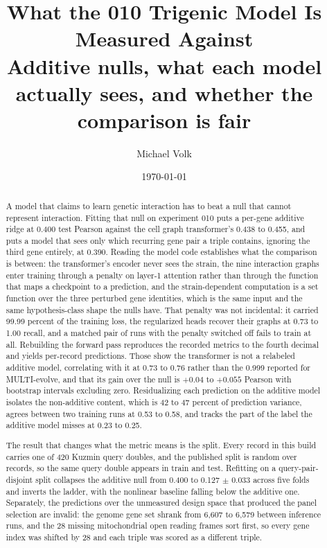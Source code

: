 \documentclass[10pt,a4paper]{article}
\title{\vspace{-1.5em}What the 010 Trigenic Model Is Measured Against\\
  {\large Additive nulls, what each model actually sees, and whether the
   comparison is fair}}
\author{Michael Volk}
\date{\today}
\begin{document}
\maketitle
\thispagestyle{empty}

\begin{abstract}
\noindent
A model that claims to learn genetic interaction has to beat a null that cannot
represent interaction. Fitting that null on experiment 010 puts a per-gene
additive ridge at 0.400 test Pearson against the cell graph transformer's 0.438
to 0.455, and puts a model that sees only which recurring gene pair a triple
contains, ignoring the third gene entirely, at 0.390. Reading the model code
establishes what the comparison is between: the transformer's encoder never sees
the strain, the nine interaction graphs enter training through a penalty on
layer-1 attention rather than through the function that maps a checkpoint to a
prediction, and the strain-dependent computation is a set function over the
three perturbed gene identities, which is the same input and the same
hypothesis-class shape the nulls have. That penalty was not incidental: it
carried 99.99 percent of the training loss, the regularized heads recover their
graphs at 0.73 to 1.00 recall, and a matched pair of runs with the penalty
switched off fails to train at all. Rebuilding the forward pass reproduces the
recorded metrics to the fourth decimal and yields per-record predictions. Those
show the transformer is not a relabeled additive model, correlating with it at
0.73 to 0.76 rather than the 0.999 reported for MULTI-evolve, and that its gain
over the null is $+0.04$ to $+0.055$ Pearson with bootstrap intervals excluding
zero. Residualizing each prediction on the additive model isolates the
non-additive content, which is 42 to 47 percent of prediction variance, agrees
between two training runs at 0.53 to 0.58, and tracks the part of the label the
additive model misses at 0.23 to 0.25.

The result that changes what the metric means is the split. Every record in this
build carries one of 420 Kuzmin query doubles, and the published split is random
over records, so the same query double appears in train and test. Refitting on a
query-pair-disjoint split collapses the additive null from 0.400 to 0.127
$\pm$ 0.033 across five folds and inverts the ladder, with the nonlinear
baseline falling below the additive one. Separately, the predictions over the
unmeasured design space that produced the panel selection are invalid: the
genome gene set shrank from 6{,}607 to 6{,}579 between inference runs, and the
28 missing mitochondrial open reading frames sort first, so every gene index was
shifted by 28 and each triple was scored as a different triple.
\end{abstract}

\vspace{0.5em}
\tccontents
\clearpage










\end{document}
